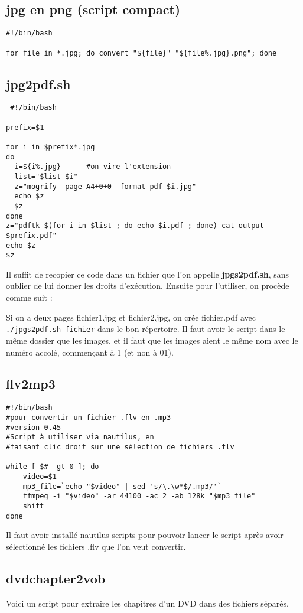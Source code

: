 \documentclass[a4paper,twoside]{article}
\begin{document}
\subsection{jpg en png (script compact)}
\begin{verbatim}
#!/bin/bash

for file in *.jpg; do convert "${file}" "${file%.jpg}.png"; done
\end{verbatim}


\subsection{jpg2pdf.sh}
\begin{verbatim}
 #!/bin/bash

prefix=$1

for i in $prefix*.jpg
do
  i=${i%.jpg}      #on vire l'extension
  list="$list $i"
  z="mogrify -page A4+0+0 -format pdf $i.jpg"
  echo $z
  $z
done
z="pdftk $(for i in $list ; do echo $i.pdf ; done) cat output $prefix.pdf"
echo $z
$z
\end{verbatim}
Il suffit de recopier ce code dans un fichier que l'on appelle \textbf{jpgs2pdf.sh}, sans oublier de lui donner les droits d'exécution. Ensuite pour l'utiliser, on procède comme suit :

Si on a deux pages fichier1.jpg et fichier2.jpg, on crée fichier.pdf avec \verb|./jpgs2pdf.sh fichier| dans le bon répertoire.
Il faut avoir le script dans le même dossier que les images, et il faut que les images aient le même nom avec le numéro accolé, commençant à 1 (et non à 01).

\subsection{flv2mp3}
\begin{verbatim}
#!/bin/bash
#pour convertir un fichier .flv en .mp3
#version 0.45
#Script à utiliser via nautilus, en
#faisant clic droit sur une sélection de fichiers .flv

while [ $# -gt 0 ]; do
	video=$1
	mp3_file=`echo "$video" | sed 's/\.\w*$/.mp3/'`
	ffmpeg -i "$video" -ar 44100 -ac 2 -ab 128k "$mp3_file"
	shift
done
\end{verbatim}

Il faut avoir installé nautilus-scripts pour pouvoir lancer le script après avoir sélectionné les fichiers .flv que l'on veut convertir.

\subsection{dvdchapter2vob}\label{sec:dvdchapter2vob}
Voici un script pour extraire les chapitres d'un DVD dans des fichiers séparés.
\end{document}
